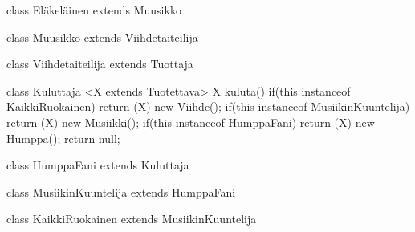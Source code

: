 \begin{javacode}
class Eläkeläinen extends Muusikko{
  
}

class Muusikko extends Viihdetaiteilija{
  
}

class Viihdetaiteilija extends Tuottaja{
  
}

class Kuluttaja{
  <X extends Tuotettava> X kuluta() {
    if(this instanceof KaikkiRuokainen) {
      return (X) new Viihde();
    }
    if(this instanceof MusiikinKuuntelija) {
      return (X) new Musiikki();
    }
    if(this instanceof HumppaFani) {
      return (X) new Humppa();
    }
    return null;
  }
}

class HumppaFani extends Kuluttaja{
  
}

class MusiikinKuuntelija extends HumppaFani{
  
}

class KaikkiRuokainen extends MusiikinKuuntelija{
  
}
\end{javacode}